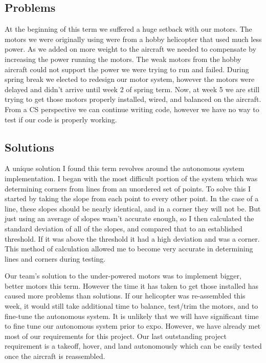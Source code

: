 \documentclass[onecolumn, draftclsnofoot,10pt, compsoc]{IEEEtran}
\begin{document}
\subsection{Problems}

At the beginning of this term we suffered a huge setback with our motors. The motors we were originally using were from a hobby helicopter that used much less power. As we added on more weight to the aircraft we needed to compensate by increasing the power running the motors. The weak motors from the hobby aircraft could not support the power we were trying to run and failed. During spring break we elected to redesign our motor system, however the motors were delayed and didn’t arrive until week 2 of spring term. Now, at week 5 we are still trying to get those motors properly installed, wired, and balanced on the aircraft. From a CS perspective we can continue writing code, however we have no way to test if our code is properly working.

\subsection{Solutions}

A unique solution I found this term revolves around the autonomous system implementation. I began with the most difficult portion of the system which was determining corners from lines from an unordered set of points. To solve this I started by taking the slope from each point to every other point. In the case of a line, these slopes should be nearly identical, and in a corner they will not be. But just using an average of slopes wasn’t accurate enough, so I then calculated the standard deviation of all of the slopes, and compared that to an established threshold. If it was above the threshold it had a high deviation and was a corner. This method of calculation allowed me to become very accurate in determining lines and corners during testing.

Our team’s solution to the under-powered motors was to implement bigger, better motors this term. However the time it has taken to get those installed has caused more problems than solutions. If our helicopter was re-assembled this week, it would still take additional time to balance, test/trim the motors, and to fine-tune the autonomous system. It is unlikely that we will have significant time to fine tune our autonomous system prior to expo. However, we have already met most of our requirements for this project. Our last outstanding project requirement is a takeoff, hover, and land autonomously which can be easily tested once the aircraft is reassembled.
\end{document}
